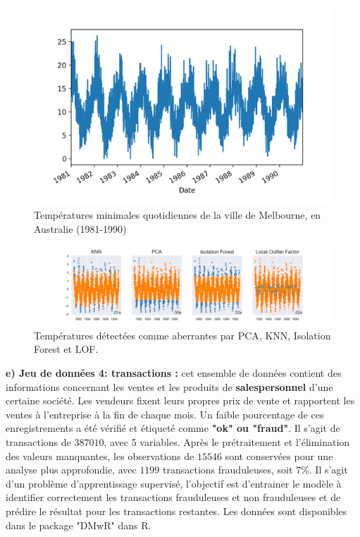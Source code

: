 \begin{figure}[H]
    \centering
    \includegraphics[width=.5\textwidth]{ADOA/Images/Temp1.png}
    \caption{Températures minimales quotidiennes de la ville de Melbourne, en Australie (1981-1990)}%
    \label{fig2t}
\end{figure}

\begin{figure}[ht!]
    \centering
    \includegraphics[width=1\textwidth]{ADOA/Images/Temp2.png}
    \caption{Températures détectées comme aberrantes par PCA, KNN, Isolation Forest et LOF.}%
    \label{fig2t1}
\end{figure}

%
%
%
\noindent \textbf{e) Jeu de données 4: transactions :} cet ensemble de données contient des informations concernant les ventes et les produits de \textbf{salespersonnel} d'une certaine société. Les vendeurs fixent leurs propres prix de vente et rapportent les ventes à l'entreprise à la fin de chaque mois. Un faible pourcentage de ces enregistrements a été vérifié et étiqueté comme \textbf{"ok" ou "fraud"}. Il s'agit de transactions de $387010$, avec 5 variables. Après le prétraitement et l'élimination des valeurs manquantes, les observations de $15546$ sont conservées pour une analyse plus approfondie, avec $1199$ transactions frauduleuses, soit $7 \%$. Il s'agit d'un problème d'apprentissage supervisé, l'objectif est d'entrainer le modèle à identifier correctement les transactions frauduleuses et non frauduleuses et de prédire le résultat pour les transactions restantes. Les données sont disponibles dans le package "DMwR" dans R.  

